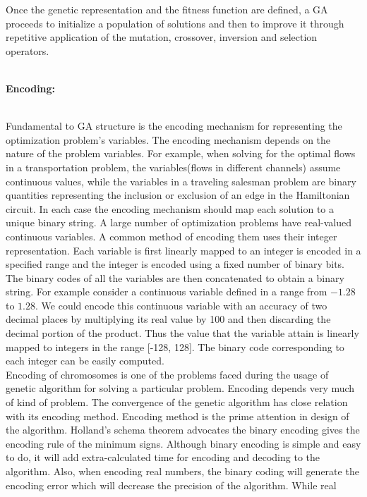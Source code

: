 \documentclass[a4paper, 12pt]{article}
\begin{document}
Once the genetic representation and the fitness function are defined, a GA proceeds to initialize a population of solutions and then to improve it through repetitive application of the mutation, crossover, inversion and selection operators.\\~\\
\begin{large}\textbf{Encoding:}\end{large}\\
Fundamental to GA structure is the encoding mechanism for representing the optimization problem's variables. The encoding mechanism depends on
the nature of the problem variables. For example, when solving for the optimal flows in a transportation problem, the variables(flows in 
different channels) assume continuous values, while the variables in a traveling salesman problem are binary quantities representing the 
inclusion or exclusion of an edge in the Hamiltonian circuit. In each case the encoding mechanism should map each solution to a unique binary
string. A large number of optimization problems have real-valued continuous variables. A common method of encoding them uses their integer 
representation. Each variable is first linearly mapped to an integer is encoded in a specified range and the integer is encoded using a fixed
number of binary bits. The binary codes of all the variables are then concatenated to obtain a binary string. For example consider a continuous
variable defined in a range from $-1.28$ to $1.28$. We could encode this continuous variable with an accuracy of two decimal places by 
multiplying its real value by 100 and then discarding the decimal portion of the product. Thus the value that the variable attain is linearly 
mapped to integers in the range [-128, 128]. The binary code corresponding to each integer can be easily computed.\\
Encoding of chromosomes is one of the problems faced during the usage of genetic algorithm for solving a particular problem. Encoding depends very much of kind of problem. The convergence of the genetic algorithm has close relation with its encoding method. Encoding method is the prime
attention in design of the algorithm. Holland's schema theorem advocates the binary encoding gives the encoding rule of the minimum signs. 
Although binary encoding is simple and easy to do, it will add extra-calculated time for encoding and decoding to the algorithm. Also, when 
encoding real numbers, the binary coding will generate the encoding error which will decrease the precision of the algorithm. While real 
\end{document}
